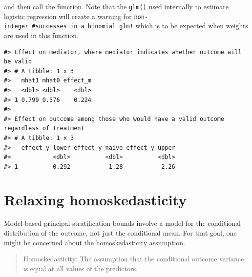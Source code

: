 \documentclass[
]{book}
\newenvironment{Shaded}{\begin{snugshade}}{\end{snugshade}}
\newcommand{\AttributeTok}[1]{\textcolor[rgb]{0.13,0.29,0.53}{#1}}
\newcommand{\CommentTok}[1]{\textcolor[rgb]{0.56,0.35,0.01}{\textit{#1}}}
\newcommand{\FunctionTok}[1]{\textcolor[rgb]{0.13,0.29,0.53}{\textbf{#1}}}
\newcommand{\NormalTok}[1]{#1}
\newcommand{\OtherTok}[1]{\textcolor[rgb]{0.56,0.35,0.01}{#1}}
\newcommand{\SpecialCharTok}[1]{\textcolor[rgb]{0.81,0.36,0.00}{\textbf{#1}}}
\newcommand{\StringTok}[1]{\textcolor[rgb]{0.31,0.60,0.02}{#1}}
\begin{document}
and then call the function. Note that the \texttt{glm()} used internally to estimate logistic regression will create a warning for \texttt{non-integer\ \#successes\ in\ a\ binomial\ glm!} which is to be expected when weights are used in this function.

\begin{Shaded}
\end{Shaded}

\begin{verbatim}
#> Effect on mediator, where mediator indicates whether outcome will be valid
#> # A tibble: 1 x 3
#>   mhat1 mhat0 effect_m
#>   <dbl> <dbl>    <dbl>
#> 1 0.799 0.576    0.224
#> 
#> Effect on outcome among those who would have a valid outcome regardless of treatment
#> # A tibble: 1 x 3
#>   effect_y_lower effect_y_naive effect_y_upper
#>            <dbl>          <dbl>          <dbl>
#> 1          0.292           1.28           2.26
\end{verbatim}

\hypertarget{relaxing-homoskedasticity}{%
\chapter{Relaxing homoskedasticity}\label{relaxing-homoskedasticity}}

Model-based principal stratification bounds involve a model for the conditional distribution of the outcome, not just the conditional mean. For that goal, one might be concerned about the homoskedasticity assumption.

\begin{quote}
Homoskedasticity: The assumption that the conditional outcome variance is equal at all values of the predictors.
\end{quote}
\end{document}
